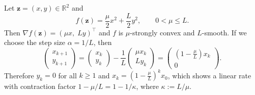 \begin{example}
Let $\mathbf{z}=(x,y)\in\mathbb{R}^2$ and
\[
  f(\mathbf{z})=\frac{\mu}{2}x^2+\frac{L}{2}y^2,
  \qquad
  0<\mu\le L.
\]
Then $\nabla f(\mathbf{z})=(\mu x,\; Ly)^\top$ and $f$ is $\mu$-strongly convex and $L$-smooth.
If we choose the step size $\alpha=1/L$, then
\[
  \begin{pmatrix}
    x_{k+1}\\
    y_{k+1}
  \end{pmatrix}
  =
  \begin{pmatrix}
    x_k\\
    y_k
  \end{pmatrix}
  -\frac{1}{L}
  \begin{pmatrix}
    \mu x_k\\
    Ly_k
  \end{pmatrix}
  =
  \begin{pmatrix}
    \left(1-\frac{\mu}{L}\right)x_k\\
    0
  \end{pmatrix}.
\]
Therefore $y_k=0$ for all $k\ge 1$ and $x_k=\left(1-\frac{\mu}{L}\right)^k x_0$, which shows a
linear rate with contraction factor $1-\mu/L=1-1/\kappa$, where $\kappa:=L/\mu$.
\end{example}
